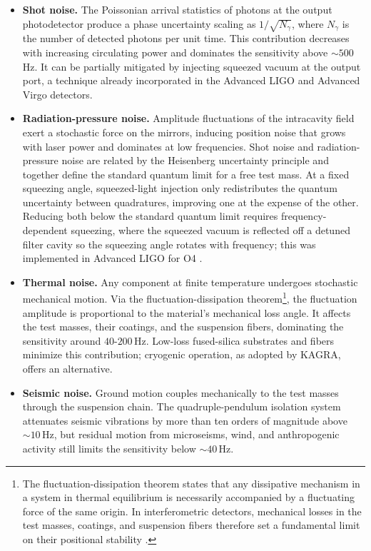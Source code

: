 \begin{itemize}

    \item \textbf{Shot noise.} The Poissonian arrival statistics of photons at the output photodetector produce a phase uncertainty scaling as $1/\sqrt{N_\gamma}$, where $N_\gamma$ is the number of detected photons per unit time. This contribution decreases with increasing circulating power and dominates the sensitivity above $\sim\!500$\,Hz. It can be partially mitigated by injecting squeezed vacuum at the output port, a technique already incorporated 
    in the Advanced LIGO and Advanced Virgo detectors.

    \item \textbf{Radiation-pressure noise.} Amplitude fluctuations of the intracavity field exert a stochastic force on the mirrors, inducing position noise that grows with laser power and dominates at low frequencies. Shot noise and radiation-pressure noise are related by the Heisenberg uncertainty principle and together define the standard quantum limit for a free test mass. At a fixed squeezing angle, squeezed-light injection only redistributes the quantum uncertainty between quadratures, improving one at the expense of the other. Reducing both below the standard quantum limit requires frequency-dependent squeezing, where the squeezed vacuum is reflected off a detuned filter cavity so the squeezing angle rotates with frequency; this was implemented in Advanced LIGO for O4 \cite{frequency_dependent_squeezing}.

    \item \textbf{Thermal noise.} Any component at finite temperature undergoes stochastic mechanical motion. Via the fluctuation-dissipation theorem\footnote{The fluctuation-dissipation theorem states that any dissipative mechanism in a system in thermal equilibrium is necessarily accompanied by a fluctuating force of the same origin. In interferometric detectors, mechanical losses in the test masses, coatings, and suspension fibers therefore set a fundamental limit on their positional stability \cite{Kubo1966}.}, the fluctuation amplitude is proportional to the material's mechanical loss angle. It affects the test masses, their coatings, and the suspension fibers, dominating the sensitivity around $40$-$200$\,Hz. Low-loss fused-silica substrates and fibers minimize this contribution; cryogenic operation, as adopted by KAGRA, offers an alternative.

    \item \textbf{Seismic noise.} Ground motion couples mechanically to the test masses through the suspension chain. The quadruple-pendulum isolation system attenuates seismic vibrations by more than ten orders of magnitude above $\sim\!10$\,Hz, but residual motion from microseisms, wind, and anthropogenic activity still limits the sensitivity below $\sim\!40$\,Hz.


\end{itemize}
